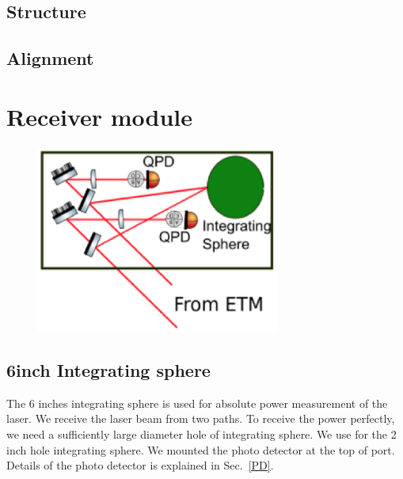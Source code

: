 \subsection{Structure}
\subsection{Alignment}

\section{Receiver module}

\begin{figure}
\begin{center}
\includegraphics[width=8cm]{Figures/Rx_module_layout.eps}
\caption{} 
\label{fig:Rx_module_layout} 
\end{center}
\end{figure}
\subsection{6inch Integrating sphere}
The 6 inches integrating sphere is used for absolute power measurement of the laser. We receive the laser beam from two paths. To receive the power perfectly, we need a sufficiently large diameter hole of integrating sphere. We use for the 2 inch hole integrating sphere. We mounted the photo detector at the top of port. Details of the photo detector is explained in Sec.~\ref{PD}.

